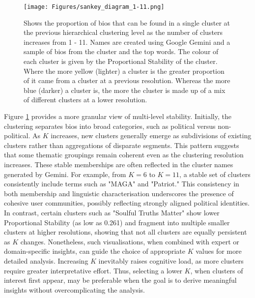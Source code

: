 \documentclass{article}
\begin{document}
\begin{figure}[ht]
\centering
\texttt{[image: Figures/sankey\_diagram\_1-11.png]}
\caption{Shows the proportion of bios that can be found in a single cluster at the previous hierarchical clustering level 
as the number of clusters increases from 1 - 11.  Names are created using Google Gemini and a sample of bios from the cluster and the top words. The colour of each cluster is given by the Proportional Stability of the cluster. Where the more yellow (lighter) a cluster is the greater proportion of it came from a cluster at a previous resolution. Whereas the more blue (darker) a cluster is, the more the cluster is made up of a mix of different clusters at a lower resolution.}
\label{fig:Sankey10}
\end{figure}



Figure \ref{fig:Sankey10} provides a more granular view of multi-level stability. Initially, the clustering separates bios into broad categories, such as political versus non-political. As $K$ increases, new clusters generally emerge as subdivisions of existing clusters rather than aggregations of disparate segments. This pattern suggests that some thematic groupings remain coherent even as the clustering resolution increases.
These stable memberships are often reflected in the cluster names generated by Gemini. For example, from $K=6$ to $K=11$, a stable set of clusters consistently include terms such as "MAGA" and "Patriot." This consistency in both membership and linguistic characterisation underscores the presence of cohesive user communities, possibly reflecting strongly aligned political identities. In contrast, certain clusters such as "Soulful Truths Matter" show lower Proportional Stability (as low as 0.261) and fragment into multiple smaller clusters at higher resolutions, showing that not all clusters are equally persistent as $K$ changes.
Nonetheless, such visualisations, when combined with expert or domain-specific insights, can guide the choice of appropriate $K$ values for more detailed analysis. Increasing $K$ inevitably raises cognitive load, as more clusters require greater interpretative effort. Thus, selecting a lower $K$, when clusters of interest first appear, may be preferable when the goal is to derive meaningful insights without overcomplicating the analysis.
\end{document}
